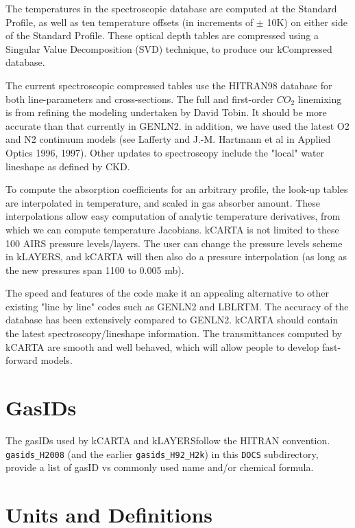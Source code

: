 \documentclass[11pt]{article}
\begin{document}
The temperatures in the spectroscopic database are computed at the
Standard Profile, as well as ten temperature offsets (in increments of
$\pm$ 10K) on either side of the Standard Profile. These optical depth
tables are compressed using a Singular Value Decomposition (SVD)
technique, to produce our kCompressed database.

The current spectroscopic compressed tables use the HITRAN98 database
for both line-parameters and cross-sections. The full and first-order
$CO_{2}$ linemixing is from refining the modeling undertaken by David
Tobin. It should be more accurate than that currently in GENLN2. in
addition, we have used the latest O2 and N2 continuum models (see
Lafferty and J.-M. Hartmann et al in Applied Optics 1996, 1997). Other
updates to spectroscopy include the "local" water lineshape as defined
by CKD.

To compute the absorption coefficients for an arbitrary profile, the
look-up tables are interpolated in temperature, and scaled in gas
absorber amount. These interpolations allow easy computation of analytic
temperature derivatives, from which we can compute temperature
Jacobians. kCARTA is not limited to these 100 AIRS pressure
levels/layers. The user can change the pressure levels scheme in
kLAYERS, and kCARTA will then also do a pressure interpolation (as long
as the new pressures span 1100 to 0.005 mb).

The speed and features of the code make it an appealing alternative to
other existing "line by line" codes such as GENLN2 and LBLRTM. The
accuracy of the database has been extensively compared to GENLN2. kCARTA
should contain the latest spectroscopy/lineshape information. The
transmittances computed by kCARTA are smooth and well behaved, which
will allow people to develop fast-forward models.

\section{GasIDs}
\label{sec-5}

The gasIDs used by kCARTA and kLAYERSfollow the HITRAN convention.
\texttt{gasids\_H2008} (and the earlier \texttt{gasids\_H92\_H2k}) in this \texttt{DOCS}
subdirectory, provide a list of gasID vs commonly used name and/or
chemical formula.

\section{Units and Definitions}
\label{sec-6}
\end{document}
